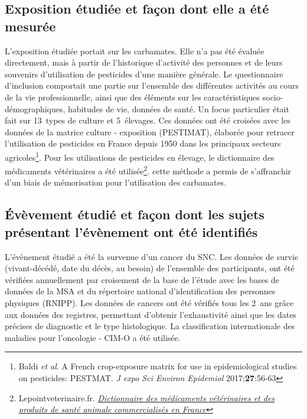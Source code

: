 \documentclass[10pt]{article}
\begin{document}
\subsection{Exposition étudiée et façon dont elle a été mesurée}
\label{exposition}
L'exposition étudiée portait sur les carbamates. Elle n'a pas été évaluée directement, mais à partir de l'historique d'activité des personnes et de leurs souvenirs d'utilisation de pesticides d'une manière générale. Le questionnaire d'inclusion comportait une partie sur l'ensemble des différentes activités au cours de la vie professionnelle, ainsi que des éléments sur les caractéristiques socio-démographiques, habitudes de vie, données de santé. Un focus particulier était fait sur 13~types de culture et 5~élevages. Ces données ont été croisées avec les données de la matrice culture - exposition (PESTIMAT), élaborée pour retracer l'utilisation de pesticides en France depuis 1950 dans les principaux secteurs agricoles\footnote{Baldi \emph{et al}. A French crop-exposure matrix for use in epidemiological studies on pesticides: PESTMAT. \emph{J expo Sci Environ Epidemiol} 2017;\textbf{27}:56-63}. Pour les utilisations de pesticides en élevage, le dictionnaire des médicaments vétérinaires a été utilisée\footnote{Lepointveterinaire.fr. \emph{\href{https://www.lepointveterinaire.fr/dmv/consulter.html}{Dictionnaire des médicaments vétérinaires et des produits de santé animale commercialisés en France}}}. cette méthode a permis de s'affranchir d'un biais de mémorisation pour l'utilisation des carbamates.

\subsection{\'{E}vèvement étudié et façon dont les sujets présentant l'évènement ont été identifiés}
L'évènement étudié a été la survenue d'un cancer du SNC. Les données de survie (vivant-décédé, date du décès, au besoin) de l'ensemble des participants, ont été vérifiées annuellement par croisement de la base de l'étude avec les bases de données de la MSA et du répertoire national d'identification des personnes physiques (RNIPP). Les données de cancers ont été vérifiés tous les 2~ans grâce aux données des registres, permettant d'obtenir l'exhaustivité ainsi que les dates précises de diagnostic et le type histologique. La classification internationale des maladies pour l'oncologie - CIM-O a été utilisée.
\end{document}
